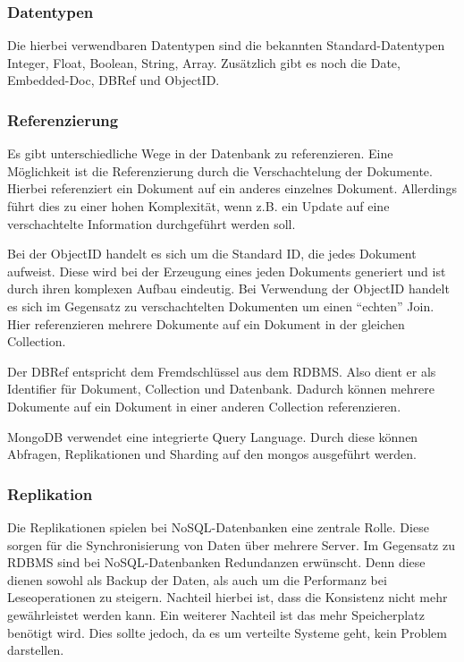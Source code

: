 \subsubsection{Datentypen}
Die hierbei verwendbaren Datentypen sind die bekannten Standard-Datentypen
Integer, Float, Boolean, String, Array. Zusätzlich gibt es noch die Date, Embedded-Doc, DBRef und
ObjectID.

\subsubsection{Referenzierung}
Es gibt unterschiedliche Wege in der Datenbank zu referenzieren.
Eine Möglichkeit ist die Referenzierung durch die Verschachtelung der Dokumente.
Hierbei referenziert ein Dokument auf ein anderes einzelnes Dokument.
Allerdings führt dies zu einer hohen Komplexität, wenn z.B. ein Update auf
eine verschachtelte Information durchgeführt werden soll.

Bei der ObjectID handelt es sich um die Standard ID, die jedes Dokument
aufweist. Diese wird bei der Erzeugung eines jeden Dokuments generiert
und ist durch ihren komplexen Aufbau eindeutig. Bei Verwendung der
ObjectID handelt es sich im Gegensatz zu verschachtelten Dokumenten um
einen ``echten'' Join. Hier referenzieren mehrere Dokumente auf ein Dokument
in der gleichen Collection.

Der DBRef entspricht dem Fremdschlüssel aus dem
RDBMS. Also dient er als Identifier für Dokument, Collection und
Datenbank. Dadurch können mehrere Dokumente auf ein Dokument in einer anderen
Collection referenzieren.

MongoDB verwendet eine integrierte Query Language. Durch
diese können Abfragen, Replikationen und Sharding auf den mongos ausgeführt werden.

\subsubsection{Replikation}
Die Replikationen spielen bei NoSQL-Datenbanken eine zentrale Rolle. Diese sorgen für die Synchronisierung von Daten über mehrere
Server. Im Gegensatz zu RDBMS sind bei NoSQL-Datenbanken Redundanzen erwünscht.
Denn diese dienen sowohl als Backup der Daten, als auch um die Performanz bei
Leseoperationen zu steigern. Nachteil hierbei ist, dass die Konsistenz nicht mehr gewährleistet werden kann.
Ein weiterer Nachteil ist das mehr Speicherplatz benötigt wird. Dies sollte jedoch, da es um
verteilte Systeme geht, kein Problem darstellen.

